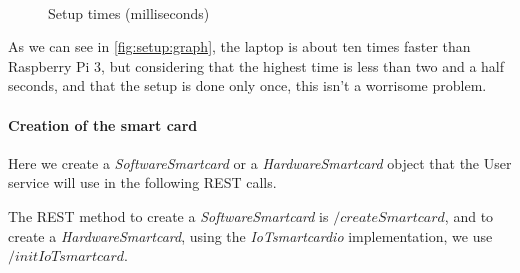 \begin{figure}[bth]
	\myfloatalign
	 \quad
	 \\
	\caption{Setup times (milliseconds)}
	\label{fig:setup:graph}
\end{figure}

As we can see in \autoref{fig:setup:graph}, the laptop is about ten times faster than Raspberry Pi 3, but considering that the highest time is less than two and a half seconds, and that the setup is done only once, this isn't a worrisome problem.

\paragraph{Creation of the smart card}\hfil

Here we create a \textit{SoftwareSmartcard} or a \textit{HardwareSmartcard} object that the User service will use in the following REST calls.

The REST method to create a \textit{SoftwareSmartcard} is $/createSmartcard$, and to create a \textit{HardwareSmartcard}, using the \textit{IoTsmartcardio} implementation, we use $/initIoTsmartcard$.


